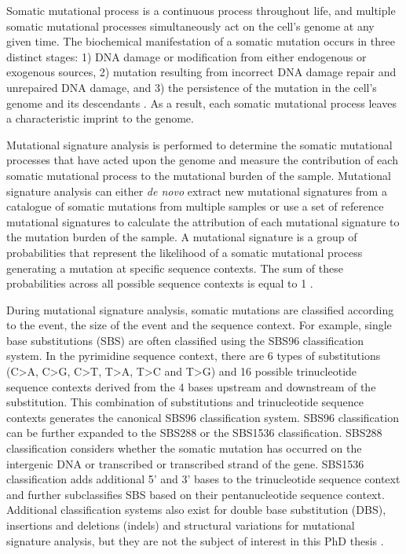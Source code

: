 Somatic mutational process is a continuous process throughout life, and multiple somatic mutational processes simultaneously act on the cell’s genome at any given time. The biochemical manifestation of a somatic mutation occurs in three distinct stages: 1) DNA damage or modification from either endogenous or exogenous sources, 2) mutation resulting from incorrect DNA damage repair and unrepaired DNA damage, and 3) the persistence of the mutation in the cell’s genome and its descendants \cite{Stratton2009-of}. As a result, each somatic mutational process leaves a characteristic imprint to the genome. 

Mutational signature analysis is performed to determine the somatic mutational processes that have acted upon the genome and measure the contribution of each somatic mutational process to the mutational burden of the sample. Mutational signature analysis can either \textit{de novo} extract new mutational signatures from a catalogue of somatic mutations from multiple samples or use a set of reference mutational signatures to calculate the attribution of each mutational signature to the mutation burden of the sample. A mutational signature is a group of probabilities that represent the likelihood of a somatic mutational process generating a mutation at specific sequence contexts. The sum of these probabilities across all possible sequence contexts is equal to 1 \cite{Alexandrov2013-fq}.

During mutational signature analysis, somatic mutations are classified according to the event, the size of the event and the sequence context. For example, single base substitutions (SBS) are often classified using the SBS96 classification system. In the pyrimidine sequence context, there are 6 types of substitutions (C>A, C>G, C>T, T>A, T>C and T>G) and 16 possible trinucleotide sequence contexts derived from the 4 bases upstream and downstream of the substitution. This combination of substitutions and trinucleotide sequence contexts generates the canonical SBS96 classification system. SBS96 classification can be further expanded to the SBS288 or the SBS1536 classification. SBS288 classification considers whether the somatic mutation has occurred on the intergenic DNA or transcribed or transcribed strand of the gene. SBS1536 classification adds additional 5’ and 3’ bases to the trinucleotide sequence context and further subclassifies SBS based on their pentanucleotide sequence context. Additional classification systems also exist for double base substitution (DBS), insertions and deletions (indels) and structural variations for mutational signature analysis, but they are not the subject of interest in this PhD thesis \cite{Alexandrov2013-kg, Alexandrov2020-ys, Li2020-vw, Steele2022-mn}.

